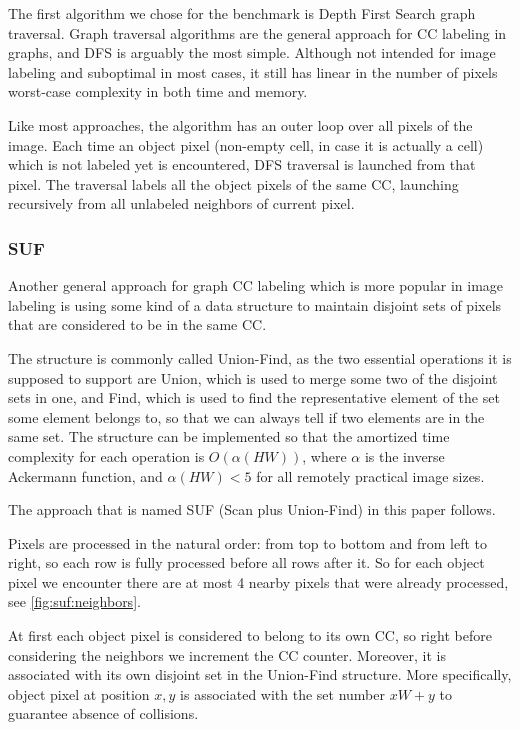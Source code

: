 \documentclass[hidelinks]{llncs}
\begin{document}
The first algorithm we chose for the benchmark is Depth First Search graph
traversal. Graph traversal algorithms are the general approach for CC labeling
in graphs, and DFS is arguably the most simple. Although not intended for image
labeling and suboptimal in most cases, it still has linear in the number of
pixels worst-case complexity in both time and memory.

Like most approaches, the algorithm has an outer loop over all pixels of the
image. Each time an object pixel (non-empty cell, in case it is actually a
cell) which is not labeled yet is encountered, DFS traversal is launched from
that pixel. The traversal labels all the object pixels of the same CC,
launching recursively from all unlabeled neighbors of current pixel.

\subsubsection{SUF}

Another general approach for graph CC labeling which is more popular in image
labeling is using some kind of a data structure to maintain disjoint sets of
pixels that are considered to be in the same CC.

The structure is commonly called Union-Find, as the two essential operations it
is supposed to support are Union, which is used to merge some two of the
disjoint sets in one, and Find, which is used to find the representative
element of the set some element belongs to, so that we can always tell if two
elements are in the same set. The structure can be implemented so that the
amortized time complexity for each operation is $O(\alpha(HW))$, where $\alpha$
is the inverse Ackermann function, and $\alpha(HW) < 5$ for all remotely
practical image sizes\cite{CLRS}. %

The approach that is named SUF (Scan plus Union-Find) in this paper follows.

Pixels are processed in the natural order: from top to bottom and from
left to right, so each row is fully processed before all rows after it.
So for each object pixel we encounter there are at most 4 nearby pixels
that were already processed, see \autoref{fig:suf:neighbors}.

At first each object pixel is considered to belong to its own CC, so right
before considering the neighbors we increment the CC counter. Moreover, it is
associated with its own disjoint set in the Union-Find structure. More
specifically, object pixel at position $x, y$ is associated with the set number
$xW + y$ to guarantee absence of collisions.
\end{document}
